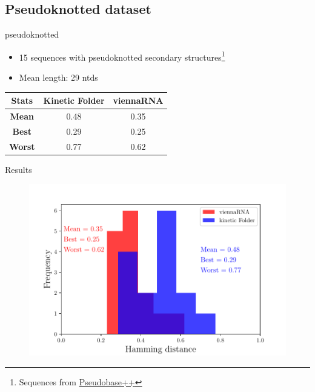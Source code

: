 \documentclass{beamer}
\begin{document}
\subsection*{Pseudoknotted dataset}
\begin{frame}{pseudoknotted}
\begin{itemize}
\item 15 sequences with pseudoknotted secondary structures\footnote{Sequences from \href{http://pseudobaseplusplus.utep.edu}{Pseudobase++} }
\item Mean length: 29 ntds
\end{itemize}
\begin{table}
\centering
\begin{tabular}{|ccc|}
\hline
{\bf Stats} & {\bf Kinetic Folder} & {\bf viennaRNA}\\
\hline
\hline
{\bf Mean} & 0.48 & 0.35 \\
{\bf Best} & 0.29 & 0.25 \\
{\bf Worst} & 0.77 & 0.62\\
\hline
\end{tabular}
\end{table}
\end{frame}

\begin{frame}{Results}
\begin{figure}
\centering
\includegraphics[scale=0.625]{pseudo_plot.pdf}
\end{figure}
\end{frame}
\end{document}
